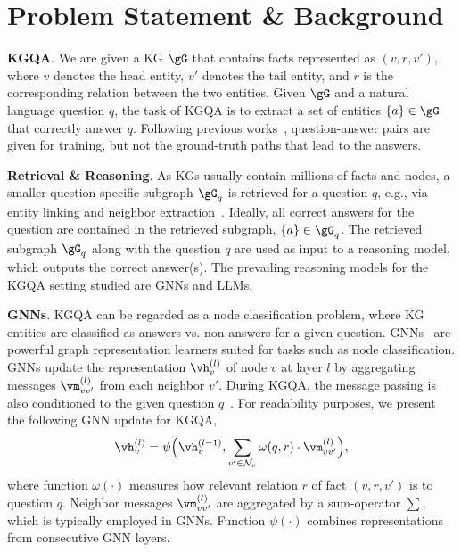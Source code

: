 \documentclass{article}
\theoremstyle{plain}
\theoremstyle{definition}
\theoremstyle{remark}
\begin{document}
\section{Problem Statement \& Background} \label{sec:problem}

\textbf{KGQA}. We are given a KG $\gG$ that contains facts represented as $(v,r,v')$, where $v$ denotes the head entity, $v'$ denotes the tail entity, and $r$ is the corresponding relation between the two entities.
Given $\gG$ and a natural language question $q$, the task of KGQA is to extract a set of entities $\{a\} \in \gG$ that correctly answer $q$. Following previous works~\citep{lan2022complex}, question-answer pairs are given for training, but not the ground-truth paths that lead to the answers. 

\textbf{Retrieval \& Reasoning}. As KGs usually contain millions of facts and nodes, a smaller question-specific subgraph $\gG_q$ is retrieved for a question $q$, e.g., via entity linking and neighbor extraction~\citep{yih2015semantic}. Ideally, all correct answers for the question are contained in the retrieved subgraph,  $\{a\} \in \gG_q$.
The retrieved subgraph $\gG_q$ along with the question $q$ are used as input to a reasoning model, which outputs the correct answer(s). The prevailing reasoning models for the KGQA setting studied are GNNs and LLMs. 

\textbf{GNNs}. KGQA can be regarded as a node classification problem, where KG entities are classified as answers vs. non-answers for a given question. 
GNNs~\cite{kipf2016semi,velivckovic2017graph,schlichtkrull2018modeling} are powerful graph representation learners suited for tasks such as node classification. 
GNNs update the representation $\vh_v^{(l)}$ of node $v$ at layer $l$ by aggregating messages $\vm^{(l)}_{vv'}$ from each neighbor $v'$. During KGQA, the message passing is also conditioned to the given question $q$~\citep{he2021improving}. For readability purposes, we present the following GNN update for KGQA,
\begin{equation}
    \vh_v^{(l)}= \psi \Big(\vh_v^{(l-1)}, \sum_{v' \in \mathcal{N}_v } \omega(q, r) \cdot \vm_{vv'}^{(l)} \Big),
    \label{eq:gnn-th}
\end{equation}
where function $\omega(\cdot)$ measures how relevant relation $r$ of fact $(v, r, v')$ is to question $q$. Neighbor messages $\vm_{vv'}^{(l)}$ are aggregated by a sum-operator $\sum$, which is typically employed in GNNs. Function $\psi(\cdot)$ combines representations from consecutive GNN layers.
\end{document}
